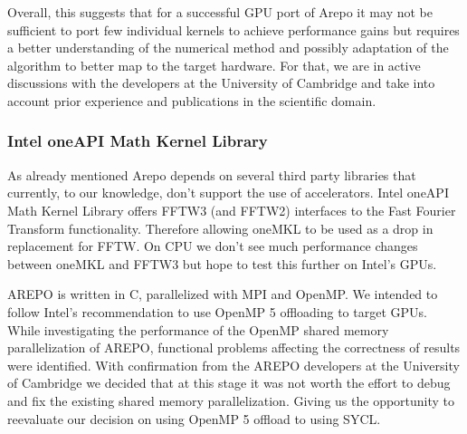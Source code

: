 \documentclass[../main]{subfiles}
\begin{document}
Overall, this suggests that for a successful GPU port of Arepo it may not be sufficient to port few individual kernels to achieve performance gains but requires a better understanding of the numerical method and possibly adaptation of the algorithm to better map to the target hardware.
For that, we are in active discussions with the developers at the University of Cambridge and take into account prior experience and publications in the scientific domain.

\subsubsection{Intel oneAPI Math Kernel Library}
As already mentioned Arepo depends on several third party libraries that currently, to our knowledge, don't support the use of accelerators. Intel oneAPI Math Kernel Library offers FFTW3 (and FFTW2) interfaces to the Fast Fourier Transform functionality. Therefore allowing oneMKL to be used as a drop in replacement for FFTW. On CPU we don't see much performance changes between oneMKL and FFTW3 but hope to test this further on Intel's GPUs. 

AREPO is written in C, parallelized with MPI and OpenMP. We intended to follow Intel’s recommendation to use OpenMP 5 offloading to target GPUs. While investigating the performance of the OpenMP shared memory parallelization of AREPO, functional problems affecting the correctness of results were identified. With confirmation from the AREPO developers at the University of Cambridge we decided that at this stage it was not worth the effort to debug and fix the existing shared memory parallelization. Giving us the opportunity to reevaluate our decision on using OpenMP 5 offload to using SYCL. 

\subsubsection{}


\end{document}

